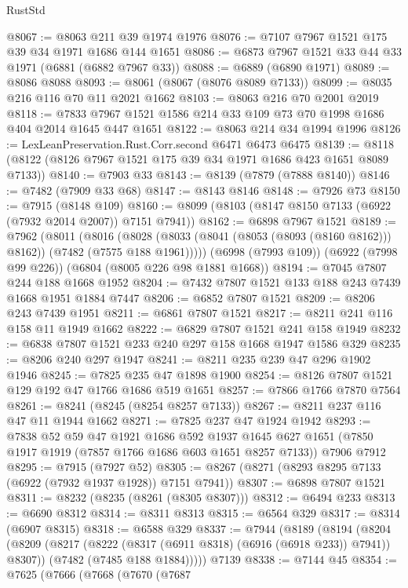 \begin{lexlean}{RustStd}
\begin{coremodule}
@8067 := @8063 @211 @39 @1974 @1976
@8076 := @7107 @7967 @1521 @175 @39 @34 @1971 @1686 @144 @1651
@8086 := @6873 @7967 @1521 @33 @44 @33 @1971 (@6881 (@6882 @7967 @33))
@8088 := @6889 (@6890 @1971)
@8089 := @8086 @8088
@8093 := @8061 (@8067 (@8076 @8089 @7133))
@8099 := @8035 @216 @116 @70 @11 @2021 @1662
@8103 := @8063 @216 @70 @2001 @2019
@8118 := @7833 @7967 @1521 @1586 @214 @33 @109 @73 @70 @1998 @1686 @404 @2014 @1645 @447 @1651
@8122 := @8063 @214 @34 @1994 @1996
@8126 := LexLeanPreservation.Rust.Corr.second @6471 @6473 @6475
@8139 := @8118 (@8122 (@8126 @7967 @1521 @175 @39 @34 @1971 @1686 @423 @1651 @8089 @7133))
@8140 := @7903 @33
@8143 := @8139 (@7879 (@7888 @8140))
@8146 := @7482 (@7909 @33 @68)
@8147 := @8143 @8146
@8148 := @7926 @73
@8150 := @7915 (@8148 @109)
@8160 := @8099 (@8103 (@8147 @8150 @7133 (@6922 (@7932 @2014 @2007)) @7151 @7941))
@8162 := @6898 @7967 @1521
@8189 := @7962
    (@8011
      (@8016
        (@8028 (@8033 (@8041 (@8053 (@8093 (@8160 @8162))) @8162)) (@7482 (@7575 @188 @1961)))))
    (@6998 (@7993 @109))
    (@6922 (@7998 @99 @226))
    (@6804 (@8005 @226 @98 @1881 @1668))
@8194 := @7045 @7807 @244 @188 @1668 @1952
@8204 := @7432 @7807 @1521 @133 @188 @243 @7439 @1668 @1951 @1884 @7447
@8206 := @6852 @7807 @1521
@8209 := @8206 @243 @7439 @1951
@8211 := @6861 @7807 @1521
@8217 := @8211 @241 @116 @158 @11 @1949 @1662
@8222 := @6829 @7807 @1521 @241 @158 @1949
@8232 := @6838 @7807 @1521 @233 @240 @297 @158 @1668 @1947 @1586 @329
@8235 := @8206 @240 @297 @1947
@8241 := @8211 @235 @239 @47 @296 @1902 @1946
@8245 := @7825 @235 @47 @1898 @1900
@8254 := @8126 @7807 @1521 @129 @192 @47 @1766 @1686 @519 @1651
@8257 := @7866 @1766 @7870 @7564
@8261 := @8241 (@8245 (@8254 @8257 @7133))
@8267 := @8211 @237 @116 @47 @11 @1944 @1662
@8271 := @7825 @237 @47 @1924 @1942
@8293 := @7838
    @52
    @59
    @47
    @1921
    @1686
    @592
    @1937
    @1645
    @627
    @1651
    (@7850 @1917 @1919 (@7857 @1766 @1686 @603 @1651 @8257 @7133))
    @7906
    @7912
@8295 := @7915 (@7927 @52)
@8305 := @8267 (@8271 (@8293 @8295 @7133 (@6922 (@7932 @1937 @1928)) @7151 @7941))
@8307 := @6898 @7807 @1521
@8311 := @8232 (@8235 (@8261 (@8305 @8307)))
@8312 := @6494 @233
@8313 := @6690 @8312
@8314 := @8311 @8313
@8315 := @6564 @329
@8317 := @8314 (@6907 @8315)
@8318 := @6588 @329
@8337 := @7944
    (@8189
      (@8194
        (@8204
          (@8209 (@8217 (@8222 (@8317 (@6911 @8318) (@6916 (@6918 @233)) @7941)) @8307))
          (@7482 (@7485 @188 @1884)))))
    @7139
@8338 := @7144 @45
@8354 := @7625
    (@7666
      (@7668
        (@7670
          (@7687

\end{coremodule}
\end{lexlean}
